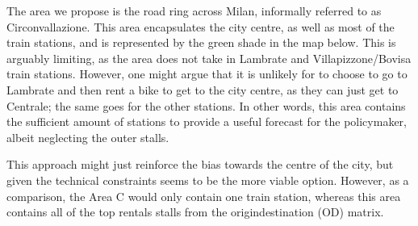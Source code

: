 \documentclass[letterpaper,10pt,english]{jupyterBook}
\begin{document}
\sphinxAtStartPar
The area we propose is the road ring across Milan, informally referred to as Circonvallazione. This area encapsulates the city centre, as well as most of the train stations, and is represented by the green shade in the map below. This is arguably limiting, as the area does not take in Lambrate and Villapizzone/Bovisa train stations. However, one might argue that it is unlikely for to choose to go to Lambrate and then rent a bike to get to the city centre, as they can just get to Centrale; the same goes for the other stations. In other words, this area contains the sufficient amount of stations to provide a useful forecast for the policymaker, albeit neglecting the outer stalls.

\sphinxAtStartPar
This approach might just reinforce the bias towards the centre of the city, but given the technical constraints seems to be the more viable option. However, as a comparison, the Area C would only contain one train station, whereas this area contains all of the top rentals stalls from the origin\sphinxhyphen{}destination (OD) matrix.
\end{document}
